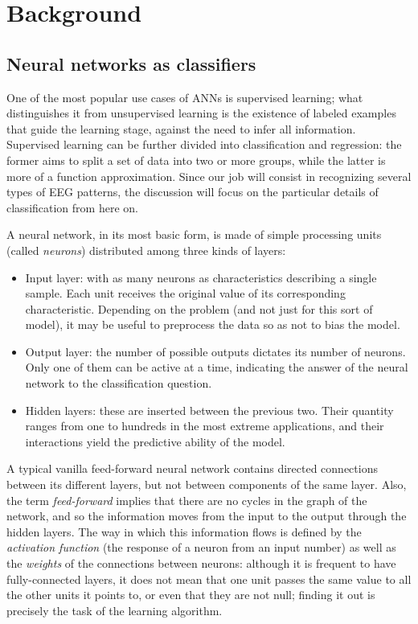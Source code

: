 \chapter{Background}\label{ch:background}

\section{Neural networks as classifiers}

	One of the most popular use cases of \acs{ANN}s is supervised learning; what distinguishes it from unsupervised learning is the existence of labeled examples that guide the learning stage, against the need to infer all information. Supervised learning can be further divided into classification and regression: the former aims to split a set of data into two or more groups, while the latter is more of a function approximation. Since our job will consist in recognizing several types of \acs{EEG} patterns, the discussion will focus on the particular details of classification from here on.

	A neural network, in its most basic form, is made of simple processing units (called \textit{neurons}) distributed among three kinds of layers:

	\begin{itemize}

		\item
		Input layer: with as many neurons as characteristics describing a single sample. Each unit receives the original value of its corresponding characteristic. Depending on the problem (and not just for this sort of model), it may be useful to preprocess the data so as not to bias the model.

		\item
		Output layer: the number of possible outputs dictates its number of neurons. Only one of them can be active at a time, indicating the answer of the neural network to the classification question.

		\item
		Hidden layers: these are inserted between the previous two. Their quantity ranges from one to hundreds in the most extreme applications, and their interactions yield the predictive ability of the model.

	\end{itemize}

	A typical vanilla feed-forward neural network contains directed connections between its different layers, but not between components of the same layer. Also, the term \textit{feed-forward} implies that there are no cycles in the graph of the network, and so the information moves from the input to the output through the hidden layers. The way in which this information flows is defined by the \textit{activation function} (the response of a neuron from an input number) as well as the \textit{weights} of the connections between neurons: although it is frequent to have fully-connected layers, it does not mean that one unit passes the same value to all the other units it points to, or even that they are not null; finding it out is precisely the task of the learning algorithm.

